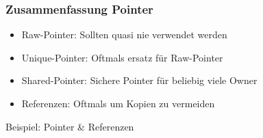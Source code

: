\documentclass[aspectratio=169]{beamer}
\begin{document}
\begin{frame}
    \frametitle{Zusammenfassung Pointer}
    \begin{itemize}
        \item Raw-Pointer: Sollten quasi nie verwendet werden
            \pause
        \item Unique-Pointer: Oftmals ersatz für Raw-Pointer
            \pause
        \item Shared-Pointer: Sichere Pointer für beliebig viele Owner
            \pause
        \item Referenzen: Oftmals um Kopien zu vermeiden
    \end{itemize}
\end{frame}

\begin{frame}
    \Huge{Beispiel: Pointer \& Referenzen}
\end{frame}
\end{document}
